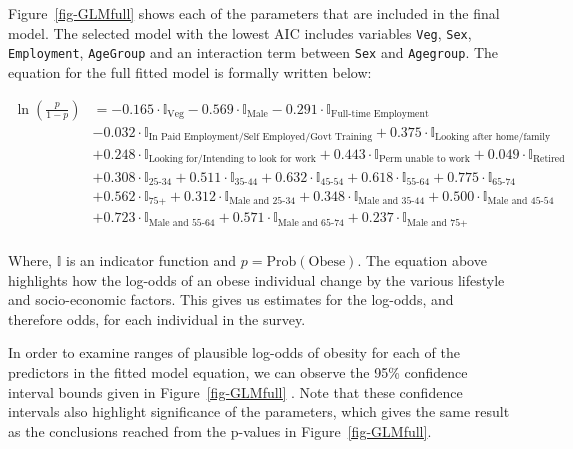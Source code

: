 \documentclass[
  letterpaper,
  DIV=11,
  numbers=noendperiod]{scrartcl}
\begin{document}
Figure~\ref{fig-GLMfull} shows each of the parameters that are included
in the final model. The selected model with the lowest AIC includes
variables \texttt{Veg}, \texttt{Sex}, \texttt{Employment},
\texttt{AgeGroup} and an interaction term between \texttt{Sex} and
\texttt{Agegroup}. The equation for the full fitted model is formally
written below:

\begin{equation*}
  \begin{aligned}
    \ln\left(\frac{p}{1-p}\right) &= -0.165\cdot\mathbb{I}_\text{Veg} -0.569\cdot\mathbb{I}_\text{Male}  -0.291\cdot\mathbb{I}_\text{Full-time Employment} \\
    &-0.032\cdot\mathbb{I}_\text{In Paid Employment/Self Employed/Govt Training} 
+0.375\cdot\mathbb{I}_\text{Looking after home/family} \\

&+ 0.248\cdot\mathbb{I}_\text{Looking for/Intending to look for work} +0.443\cdot\mathbb{I}_\text{Perm unable to work} + 0.049\cdot\mathbb{I}_\text{Retired} \\ 

&+0.308\cdot\mathbb{I}_\text{25-34} +0.511\cdot\mathbb{I}_\text{35-44} +0.632\cdot\mathbb{I}_\text{45-54} + 0.618\cdot\mathbb{I}_\text{55-64} + 0.775\cdot\mathbb{I}_\text{65-74} \\ 

&+0.562\cdot\mathbb{I}_\text{75+}+ 0.312\cdot\mathbb{I}_\text{Male and 25-34} + 0.348\cdot\mathbb{I}_\text{Male and 35-44} + 0.500\cdot\mathbb{I}_\text{Male and 45-54} \\

&+ 0.723\cdot\mathbb{I}_\text{Male and 55-64} + 0.571\cdot\mathbb{I}_\text{Male and 65-74} + 0.237\cdot\mathbb{I}_\text{Male and 75+} \\
  \end{aligned}
\end{equation*}

Where, \(\mathbb{I}\) is an indicator function and
\(p = \text{Prob}(\text{Obese})\). The equation above highlights how the
log-odds of an obese individual change by the various lifestyle and
socio-economic factors. This gives us estimates for the log-odds, and
therefore odds, for each individual in the survey.

In order to examine ranges of plausible log-odds of obesity for each of
the predictors in the fitted model equation, we can observe the 95\%
confidence interval bounds given in Figure~\ref{fig-GLMfull} . Note that
these confidence intervals also highlight significance of the
parameters, which gives the same result as the conclusions reached from
the p-values in Figure~\ref{fig-GLMfull}.
\end{document}
